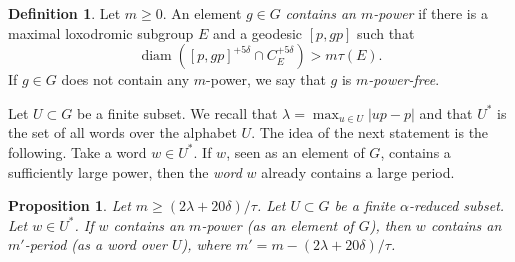 \documentclass[JEP,XML,SOM,Unicode, NoEqCountersInSection,published]{cedram}
\theoremstyle{plain}
\newtheorem{prop}[thm]{Proposition}
\theoremstyle{definition}
\newtheorem{df}[thm]{Definition}
\DeclareMathOperator{\diam}{diam}
\begin{document}
\begin{df}
\label{def: power-free}
Let $m \geq 0$.
An element $g\in G$ \emph{contains an $m$-power} if there is a maximal loxodromic subgroup $E$ and a geodesic $[p,gp]$ such that
\begin{equation*}
\diam \left( [p,gp]^{+5\delta} \cap C_E^{+5\delta}\right) > m \tau(E).
\end{equation*}
If $g\in G$ does not contain any $m$-power, we say that $g$ is \emph{$m$-power-free}.
\end{df}

Let $U\subset G$ be a finite subset.
We recall that $\lambda = \max_{u\in U}|up-p|$ and that $U^*$ is the set of all words over the alphabet $U$.
The idea of the next statement is the following.
Take a word $w \in U^*$.
If $w$, seen as an element of $G$, contains a sufficiently large power, then the \emph{word} $w$ already contains a large period.

\begin{prop}
\label{P: proper power vs strong period}
Let $m \geq (2\lambda + 20\delta)/\tau$.
Let $U\subset G$ be a finite $\alpha$-reduced subset.
Let $w\in U^*$.
If $w$ contains an $m$-power (as an element of $G$), then $w$ contains an $m'$-period (as a word over $U$), where $m' = m - (2\lambda + 20\delta)/\tau$.
\end{prop}
\end{document}
